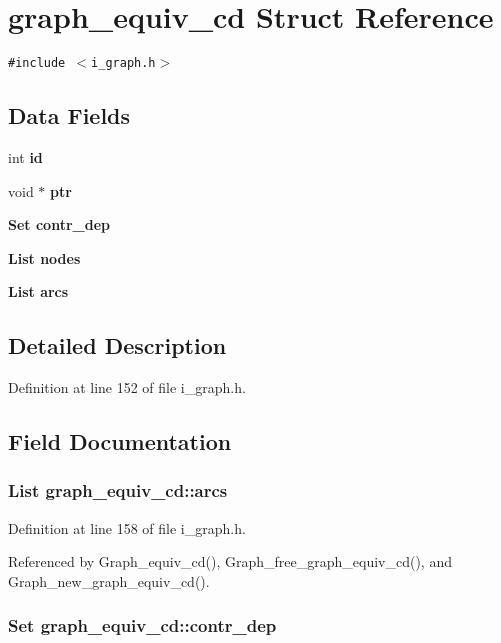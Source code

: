\section{graph\_\-equiv\_\-cd Struct Reference}
\label{structgraph__equiv__cd}
{\tt \#include $<$i\_\-graph.h$>$}

\subsection*{Data Fields}
\begin{CompactItemize}
\item 
int \bf{id}
\item 
void $\ast$ \bf{ptr}
\item 
\bf{Set} \bf{contr\_\-dep}
\item 
\bf{List} \bf{nodes}
\item 
\bf{List} \bf{arcs}
\end{CompactItemize}


\subsection{Detailed Description}




Definition at line 152 of file i\_\-graph.h.

\subsection{Field Documentation}
\subsubsection{\setlength{\rightskip}{0pt plus 5cm}\bf{List} \bf{graph\_\-equiv\_\-cd::arcs}}\label{structgraph__equiv__cd_2e402b520bcafa3c168705478cf956b8}




Definition at line 158 of file i\_\-graph.h.

Referenced by Graph\_\-equiv\_\-cd(), Graph\_\-free\_\-graph\_\-equiv\_\-cd(), and Graph\_\-new\_\-graph\_\-equiv\_\-cd().
\subsubsection{\setlength{\rightskip}{0pt plus 5cm}\bf{Set} \bf{graph\_\-equiv\_\-cd::contr\_\-dep}}\label{structgraph__equiv__cd_e499750fd8c19b7d036aec3fabd00d8d}




